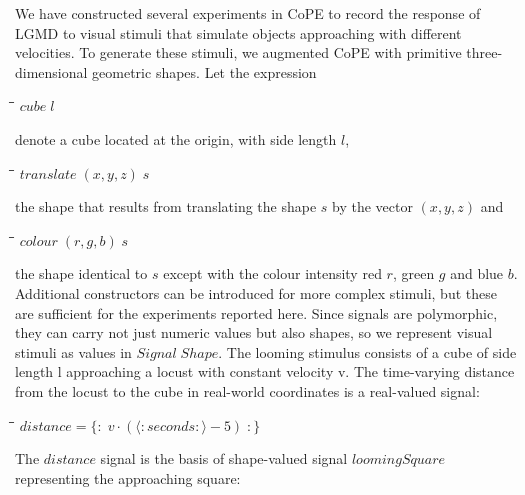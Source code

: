 \documentclass[11pt]{article}
\newlength{\lwidth}\setlength{\lwidth}{4.5cm}
\newlength{\cwidth}\setlength{\cwidth}{8mm} %
\newcommand{\Conid}[1]{\mathit{#1}}
\newcommand{\Varid}[1]{\mathit{#1}}
\begin{document}
We have constructed several experiments in CoPE to record the response
of LGMD to visual stimuli that simulate objects approaching
with different velocities. To generate these stimuli, we augmented
CoPE with primitive three-dimensional geometric shapes. Let the
expression
\begin{tabbing}
\qquad\=\hspace{\lwidth}\=\hspace{\cwidth}\=\+\kill
${\Varid{cube}\;\Varid{l}}$
\end{tabbing}denote a cube located at the origin, with side length \ensuremath{\Varid{l}},
\begin{tabbing}
\qquad\=\hspace{\lwidth}\=\hspace{\cwidth}\=\+\kill
${\Varid{translate}\;(\Varid{x},\Varid{y},\Varid{z})\;\Varid{s}}$
\end{tabbing}the shape that results from translating the shape \ensuremath{\Varid{s}} by the
vector \ensuremath{(\Varid{x},\Varid{y},\Varid{z})} and
\begin{tabbing}
\qquad\=\hspace{\lwidth}\=\hspace{\cwidth}\=\+\kill
${\Varid{colour}\;(\Varid{r},\Varid{g},\Varid{b})\;\Varid{s}}$
\end{tabbing}the shape identical to \ensuremath{\Varid{s}} except with the colour intensity red \ensuremath{\Varid{r}},
green \ensuremath{\Varid{g}} and blue \ensuremath{\Varid{b}}. Additional constructors can be introduced for
more complex stimuli, but these are sufficient for the experiments
reported here. Since signals are polymorphic, they can carry not just
numeric values but also shapes, so we represent visual stimuli as
values in \ensuremath{\Conid{Signal}\;\Conid{Shape}}. The looming stimulus consists of a cube of
side length l approaching a locust with constant velocity v. The
time-varying distance from the locust to the cube in real-world
coordinates is a real-valued signal:
\begin{tabbing}
\qquad\=\hspace{\lwidth}\=\hspace{\cwidth}\=\+\kill
${\Varid{distance}\mathrel{=}\{\!:\!\;\Varid{v}\!\cdot\!(\langle:\Varid{seconds}:\rangle\mathbin{-}\mathrm{5})\;\!:\!\}}$
\end{tabbing}
The \ensuremath{\Varid{distance}} signal is the basis of shape-valued signal
\ensuremath{\Varid{loomingSquare}} representing the approaching square:
\end{document}
